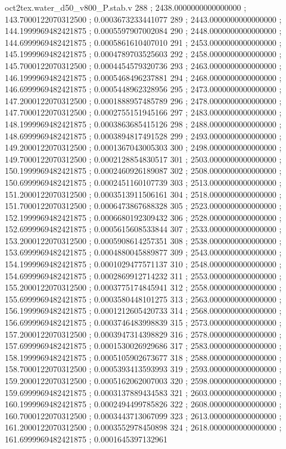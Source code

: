 \begin{filecontents}[overwrite]{oct2tex.water_d50_v800_P.stab.v}
288 ; 2438.0000000000000000 ; 143.7000122070312500 ; 0.0003673233441077
289 ; 2443.0000000000000000 ; 144.1999969482421875 ; 0.0005597907002084
290 ; 2448.0000000000000000 ; 144.6999969482421875 ; 0.0005861610407010
291 ; 2453.0000000000000000 ; 145.1999969482421875 ; 0.0004789703525603
292 ; 2458.0000000000000000 ; 145.7000122070312500 ; 0.0004454579320736
293 ; 2463.0000000000000000 ; 146.1999969482421875 ; 0.0005468496237881
294 ; 2468.0000000000000000 ; 146.6999969482421875 ; 0.0005448962328956
295 ; 2473.0000000000000000 ; 147.2000122070312500 ; 0.0001888957485789
296 ; 2478.0000000000000000 ; 147.7000122070312500 ; 0.0002755151945166
297 ; 2483.0000000000000000 ; 148.1999969482421875 ; 0.0003863685415126
298 ; 2488.0000000000000000 ; 148.6999969482421875 ; 0.0003894817491528
299 ; 2493.0000000000000000 ; 149.2000122070312500 ; 0.0001367043005303
300 ; 2498.0000000000000000 ; 149.7000122070312500 ; 0.0002128854830517
301 ; 2503.0000000000000000 ; 150.1999969482421875 ; 0.0002460926189087
302 ; 2508.0000000000000000 ; 150.6999969482421875 ; 0.0002451160107739
303 ; 2513.0000000000000000 ; 151.2000122070312500 ; 0.0003513911506161
304 ; 2518.0000000000000000 ; 151.7000122070312500 ; 0.0006473867688328
305 ; 2523.0000000000000000 ; 152.1999969482421875 ; 0.0006680192309432
306 ; 2528.0000000000000000 ; 152.6999969482421875 ; 0.0005615608533844
307 ; 2533.0000000000000000 ; 153.2000122070312500 ; 0.0005908614257351
308 ; 2538.0000000000000000 ; 153.6999969482421875 ; 0.0004880045889877
309 ; 2543.0000000000000000 ; 154.1999969482421875 ; 0.0001029477571137
310 ; 2548.0000000000000000 ; 154.6999969482421875 ; 0.0002869912714232
311 ; 2553.0000000000000000 ; 155.2000122070312500 ; 0.0003775174845941
312 ; 2558.0000000000000000 ; 155.6999969482421875 ; 0.0003580448101275
313 ; 2563.0000000000000000 ; 156.1999969482421875 ; 0.0001212605420733
314 ; 2568.0000000000000000 ; 156.6999969482421875 ; 0.0003746483998839
315 ; 2573.0000000000000000 ; 157.2000122070312500 ; 0.0003947314398829
316 ; 2578.0000000000000000 ; 157.6999969482421875 ; 0.0001530026929686
317 ; 2583.0000000000000000 ; 158.1999969482421875 ; 0.0005105902673677
318 ; 2588.0000000000000000 ; 158.7000122070312500 ; 0.0005393413593993
319 ; 2593.0000000000000000 ; 159.2000122070312500 ; 0.0005162062007003
320 ; 2598.0000000000000000 ; 159.6999969482421875 ; 0.0003137889434583
321 ; 2603.0000000000000000 ; 160.1999969482421875 ; 0.0002494499785826
322 ; 2608.0000000000000000 ; 160.7000122070312500 ; 0.0003443713067099
323 ; 2613.0000000000000000 ; 161.2000122070312500 ; 0.0003552978450898
324 ; 2618.0000000000000000 ; 161.6999969482421875 ; 0.0001645397132961

\end{filecontents}
